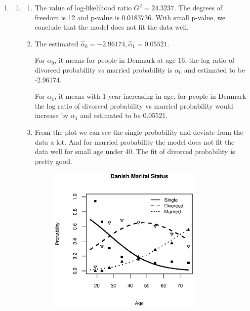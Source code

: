 \documentclass{article}
\begin{document}
\begin{enumerate}[leftmargin = 0 em, label = \arabic*., font = \bfseries]
\begin{enumerate}
		\item 


		
	
	

	
	
	\end{enumerate}
\newpage
	\item 
	\begin{enumerate}
		\item
		\begin{enumerate}
		\item The value of log-likelihood ratio $G^2 = 24.3237$. The degrees of freedom is 12 and p-value is 0.0183736. With small p-value, we conclude that the model does not fit the data well.
		
				\item 
				The estimated $\hat{\alpha}_0 = -2.96174, \hat{\alpha}_1 = 0.05521$. 
		
				For $\alpha_0$, it means for people in Denmark at age 16, the log ratio of divorced probability vs married probability is $\alpha_0$ and estimated to be -2.96174.
		
				For $\alpha_1$, it means with 1 year increasing in age, for people in Denmark the log ratio of divorced probability vs married probability would  increase by $\alpha_1$ and estimated to be 0.05521.
		
				\item From the plot we can see the single probability and deviate from the data a lot. And for married probability the model does not fit the data well for small age under 40. The fit of divorced probability is pretty good.
				\begin{figure}[!htb]
					\centering
					\includegraphics[width = 0.8\textwidth]{2A.eps}
				\end{figure}


\end{enumerate}
\end{enumerate}
\end{enumerate}
\end{document}

